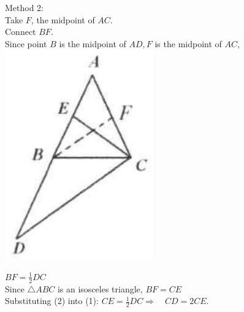 \documentclass{article}
\begin{document}
Method 2:\\
Take \(F\), the midpoint of \(A C\).\\
Connect \(B F\).\\
Since point \(B\) is the midpoint of \(A D, F\) is the midpoint of \(A C\),\\
\centering
\includegraphics[width=\textwidth]{images/039(2).jpg}

\(B F=\frac{1}{2} D C\)\\
Since \(\triangle A B C\) is an isosceles triangle, \(B F=C E\)\\
Substituting (2) into (1): \(C E=\frac{1}{2} D C \Rightarrow \quad C D=2 C E\).
\end{document}
